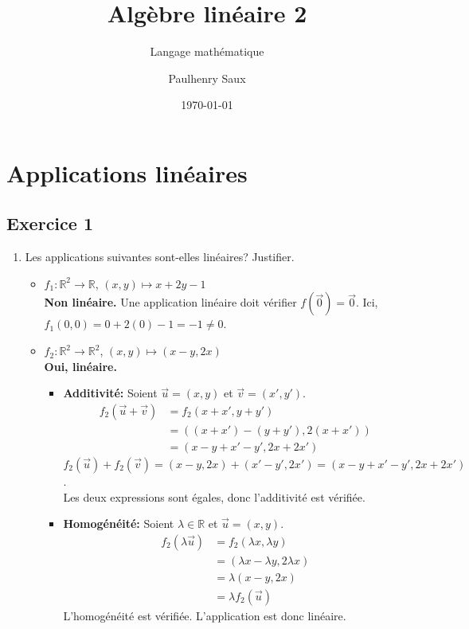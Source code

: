 \documentclass[french]{yLectureNote}
\title{Algèbre linéaire 2}
\subtitle{Langage mathématique}
\author{Paulhenry Saux}
\date{\today}
\renewcommand{\vec}{\overrightarrow}
\renewcommand{\vec}{\overrightarrow}
\begin{document}
\chapter{Applications linéaires}
\section{Exercice 1}
\begin{enumerate}
    \item Les applications suivantes sont-elles linéaires? Justifier.

    \begin{itemize}
        \item $f_{1}:\mathbb{R}^{2}\rightarrow\mathbb{R}$, $(x,y)\mapsto x+2y-1$ \\
        \textbf{Non linéaire.} Une application linéaire doit vérifier $f(\vec{0})=\vec{0}$.
        Ici, $f_{1}(0,0) = 0+2(0)-1 = -1 \neq 0$.

        \item $f_{2}:\mathbb{R}^{2}\rightarrow\mathbb{R}^{2}$, $(x,y)\mapsto(x-y,2x)$ \\
        \textbf{Oui, linéaire.}
        \begin{itemize}
            \item \textbf{Additivité:} Soient $\vec{u}=(x,y)$ et $\vec{v}=(x',y')$.
            \begin{align*}
            f_{2}(\vec{u}+\vec{v}) &= f_{2}(x+x', y+y') \\
            &= ((x+x')-(y+y'), 2(x+x')) \\
            &= (x-y+x'-y', 2x+2x')
            \end{align*}
            $f_{2}(\vec{u})+f_{2}(\vec{v}) = (x-y, 2x) + (x'-y', 2x') = (x-y+x'-y', 2x+2x')$. \\
            Les deux expressions sont égales, donc l'additivité est vérifiée.

            \item \textbf{Homogénéité:} Soient $\lambda \in \mathbb{R}$ et $\vec{u}=(x,y)$.
            \begin{align*}
            f_{2}(\lambda\vec{u}) &= f_{2}(\lambda x, \lambda y) \\
            &= (\lambda x - \lambda y, 2\lambda x) \\
            &= \lambda(x-y, 2x) \\
            &= \lambda f_{2}(\vec{u})
            \end{align*}
            L'homogénéité est vérifiée. L'application est donc linéaire.
        \end{itemize}


\end{itemize}
\end{enumerate}
\end{document}
